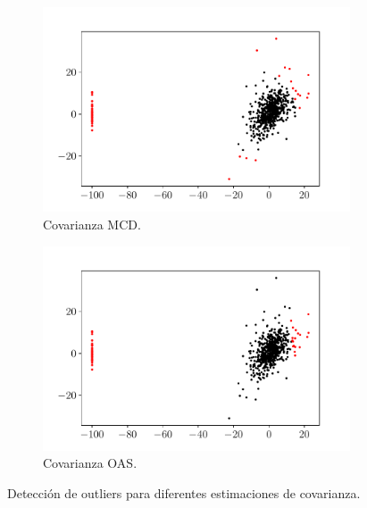 \documentclass[fleqn]{article}
\begin{document}
\begin{figure}[H]
    \begin{subfigure}[b]{0.45\textwidth}
        \centering
        \includegraphics[width=\textwidth]{src/figs/outliers_mcd.pdf}
        \caption{Covarianza MCD.}
    \end{subfigure}
    \begin{subfigure}[b]{0.45\textwidth}  
        \centering 
        \includegraphics[width=\textwidth]{src/figs/outliers_oas.pdf}
        \caption{Covarianza OAS.}
    \end{subfigure}
    \caption{Detección de outliers para diferentes estimaciones de covarianza.}
    \label{fig:outliers}
\end{figure}
\end{document}

